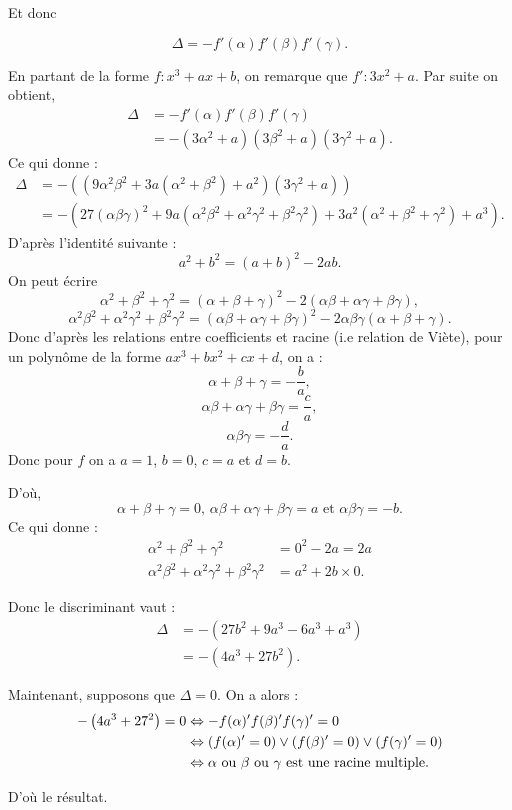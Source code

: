 \begin{demonstration}
Et donc 

\[
\Delta = - f'(\alpha) f'(\beta ) f'(\gamma)
.\] 

En partant de la forme $f : x^3 + ax + b$, on remarque que $f' : 3x^2 + a$. Par suite on obtient,
\begin{align*}
    \Delta &= - f'(\alpha) f'(\beta ) f'(\gamma) \\
      &= - \left( 3 \alpha^2 + a \right) \left( 3 \beta^2 + a \right) \left( 3 \gamma^2 + a \right) 
.\end{align*}
Ce qui donne :
\begin{align*}
    \Delta  &= - \left( ( 9 \alpha^2 \beta^2 + 3a ( \alpha^2 + \beta^2 ) + a^2 ) ( 3 \gamma^2 + a ) \right)  \\
       &= - \left( 27 \left( \alpha \beta \gamma \right)^2  + 9a \left( \alpha^2 \beta^2 + \alpha^2 \gamma^2 + \beta^2 \gamma^2 \right) + 3a^2 \left( \alpha^2 + \beta^2 + \gamma^2 \right) + a^3 \right) 
.\end{align*}
D'après l'identité suivante :
\[
a^2 + b^2 = \left( a + b \right)^2 - 2ab 
.\] 
On peut écrire
\[
\alpha^2 + \beta^2 + \gamma^2 = \left( \alpha + \beta + \gamma \right)^2 - 2 \left( \alpha \beta + \alpha \gamma + \beta \gamma \right)
,\] 
\[
\alpha^2 \beta^2 + \alpha^2 \gamma^2 + \beta^2 \gamma^2 = \left( \alpha \beta + \alpha \gamma + \beta \gamma \right)^2 - 2\alpha \beta \gamma \left( \alpha + \beta + \gamma \right)
.\] 
Donc d'après les relations entre coefficients et racine (i.e relation de Viète), pour un polynôme de la forme $ax^3 + bx^2 + cx + d$, on a :
\[
\alpha + \beta + \gamma = - \frac{b}{a}
,\] 
\[
\alpha \beta + \alpha \gamma + \beta \gamma = \frac{c}{a}
,\] 
\[
\alpha \beta \gamma = - \frac{d}{a}
.\] 
Donc pour $f$ on a $a = 1$, $b = 0$, $c = a$ et $d = b$.

D'où,
\[
\alpha + \beta + \gamma = 0 \text{, } \alpha \beta + \alpha \gamma + \beta \gamma = a \text{ et } \alpha \beta \gamma = - b
.\] 
Ce qui donne : 
\begin{align*}
    \alpha^2 + \beta^2 + \gamma^2 &= 0^2 - 2a = 2a \\
    \alpha^2 \beta^2 + \alpha^2 \gamma^2 + \beta^2 \gamma^2 &= a^2 + 2b \times 0
.\end{align*}

Donc le discriminant vaut :
\begin{align*}
    \Delta &= - \left( 27b^2 + 9a^3 - 6a^3 + a^3  \right) \\
        &= - \left( 4a^3 + 27b^2  \right)
.\end{align*}

Maintenant, supposons que $\Delta = 0$. On a alors :
 \begin{align*}
     - \left( 4a^3 + 27^2 \right) = 0 &\Leftrightarrow - f(\alpha)' f(\beta )' f(\gamma)' = 0 \\
                                      & \Leftrightarrow \left( f(\alpha)' = 0 \right) \vee \left( f(\beta )' = 0 \right) \vee \left( f(\gamma)' = 0 \right) \\
                                      &\Leftrightarrow \alpha \text{ ou } \beta \text{ ou } \gamma \text{ est une racine multiple}
.\end{align*}

D'où le résultat.
\end{demonstration}
